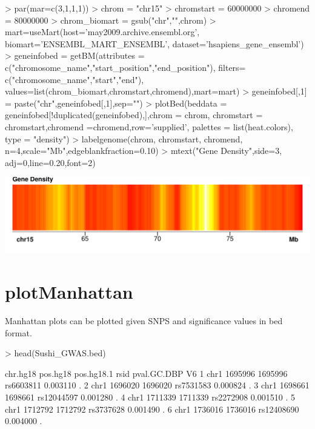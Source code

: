 \documentclass{article}
\begin{document}
\begin{center}
\begin{Schunk}
\begin{Sinput}
> par(mar=c(3,1,1,1))
> chrom            = "chr15"
> chromstart       = 60000000
> chromend         = 80000000
> chrom_biomart    = gsub("chr","",chrom)
> mart=useMart(host='may2009.archive.ensembl.org', biomart='ENSEMBL_MART_ENSEMBL', 
              dataset='hsapiens_gene_ensembl')
> geneinfobed = getBM(attributes = c("chromosome_name","start_position","end_position"),
                     filters= c("chromosome_name","start","end"),
                     values=list(chrom_biomart,chromstart,chromend),mart=mart)
> geneinfobed[,1] = paste("chr",geneinfobed[,1],sep="")
> plotBed(beddata = geneinfobed[!duplicated(geneinfobed),],chrom = chrom,
         chromstart = chromstart,chromend =chromend,row='supplied',
         palettes = list(heat.colors), type = "density")
> labelgenome(chrom, chromstart, chromend,  n=4,scale="Mb",edgeblankfraction=0.10)
> mtext("Gene Density",side=3, adj=0,line=0.20,font=2)
\end{Sinput}
\end{Schunk}
\includegraphics{Sushi-029}
\end{center}



\section{plotManhattan}

Manhattan plots can be plotted given SNPS and significance values in bed format.

\begin{Schunk}
\begin{Sinput}
>   head(Sushi_GWAS.bed)
\end{Sinput}
\begin{Soutput}
  chr.hg18 pos.hg18 pos.hg18.1       rsid pval.GC.DBP V6
1     chr1  1695996    1695996  rs6603811    0.003110  .
2     chr1  1696020    1696020  rs7531583    0.000824  .
3     chr1  1698661    1698661 rs12044597    0.001280  .
4     chr1  1711339    1711339  rs2272908    0.001510  .
5     chr1  1712792    1712792  rs3737628    0.001490  .
6     chr1  1736016    1736016 rs12408690    0.004000  .
\end{Soutput}
\end{Schunk}
\end{document}
